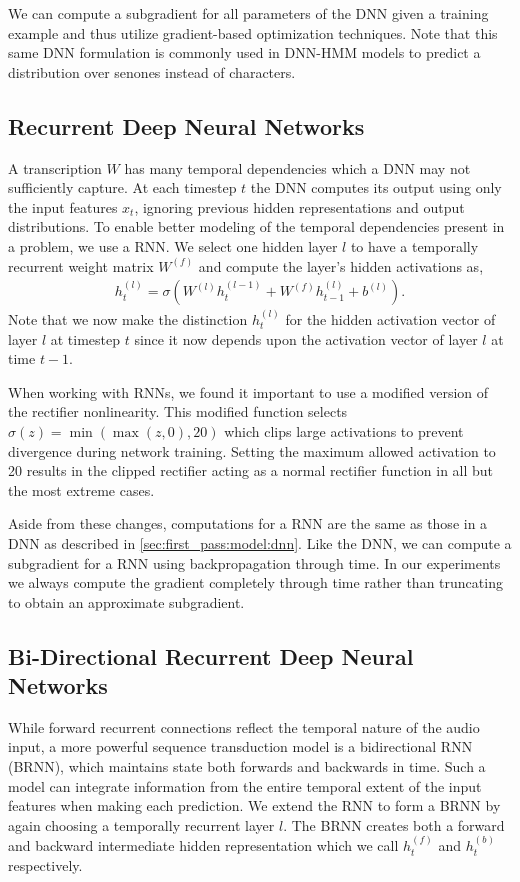 We can compute a subgradient for all parameters of the DNN given a training
example and thus utilize gradient-based optimization techniques. Note that this
same DNN formulation is commonly used in DNN-HMM models to predict a
distribution over senones instead of characters.

\subsection{Recurrent Deep Neural Networks}

A transcription $W$ has many temporal dependencies which a DNN may not
sufficiently capture. At each timestep $t$ the DNN computes its output using
only the input features $x_t$, ignoring previous hidden representations and
output distributions. To enable better modeling of the temporal dependencies
present in a problem, we use a RNN. We select one hidden layer $l$
to have a temporally recurrent weight matrix $W^{(f)}$ and compute the layer's
hidden activations as,
\begin{align*}
  h^{(l)}_t = \sigma(W^{(l)} h^{(l-1)}_t +  W^{(f)} h^{(l)}_{t-1} + b^{(l)}).
\end{align*}
Note that we now make the distinction $h^{(l)}_t$ for the hidden activation
vector of layer $l$ at timestep $t$ since it now depends upon the activation
vector of layer $l$ at time $t-1$.

When working with RNNs, we found it important to use a modified version of the
rectifier nonlinearity. This modified function selects $\sigma(z) = \min( \max
(z, 0), 20)$ which clips large activations to prevent divergence during network
training. Setting the maximum allowed activation to 20 results in the clipped
rectifier acting as a normal rectifier function in all but the most extreme
cases.

Aside from these changes, computations for a RNN are the same as those in a DNN
as described in \ref{sec:first_pass:model:dnn}. Like the DNN, we can compute a
subgradient for a RNN using backpropagation through time. In our experiments we
always compute the gradient completely through time rather than truncating to
obtain an approximate subgradient.

\subsection{Bi-Directional Recurrent Deep Neural Networks}

While forward recurrent connections reflect the temporal nature of the audio
input, a more powerful sequence transduction model is a bidirectional RNN (BRNN), which
maintains state both forwards and backwards in time. Such a model can integrate
information from the entire temporal extent of the input features when making
each prediction. We extend the RNN to form a BRNN by again choosing a
temporally recurrent layer $l$. The BRNN creates both a forward and backward
intermediate hidden representation which we call $h_t^{(f)}$ and $h_t^{(b)}$
respectively. 

